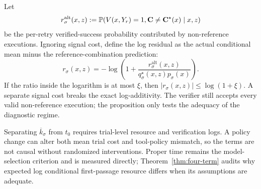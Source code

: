 \begin{proposition}
\label{prop:off-reference}
Let
\[
r_\sigma^{\mathrm{alt}}(x,z)
:=\mathbb{P}(V(x,Y_r)=1,\mathbf C\ne\mathbf C^\star(x)\mid x,z)
\]
be the per-retry verified-success probability contributed by non-reference
executions.  Ignoring signal cost, define the log residual as the actual
conditional mean minus the reference-combination prediction:
\begin{equation}
r_\sigma(x,z)=-\log\!\left(
1+\frac{r_\sigma^{\mathrm{alt}}(x,z)}{q_\sigma^\star(x,z)p_\sigma(x)}
\right).
\label{eq:off-reference-residual}
\end{equation}
If the ratio inside the logarithm is at most \(\xi\), then
\(|r_\sigma(x,z)|\le\log(1+\xi)\).  A separate signal cost breaks the exact
log-additivity.  The verifier still accepts every valid non-reference
execution; the proposition only tests the adequacy of the diagnostic regime.
\end{proposition}

Separating \(\overline k_\sigma\) from \(t_0\) requires trial-level resource and
verification logs.  A policy change can alter both mean trial cost and
tool-policy mismatch, so the terms are not causal without randomized
interventions.  Proper time remains the model-selection criterion and is
measured directly; Theorem~\ref{thm:four-term} audits why expected log
conditional first-passage resource differs when its assumptions are adequate.

